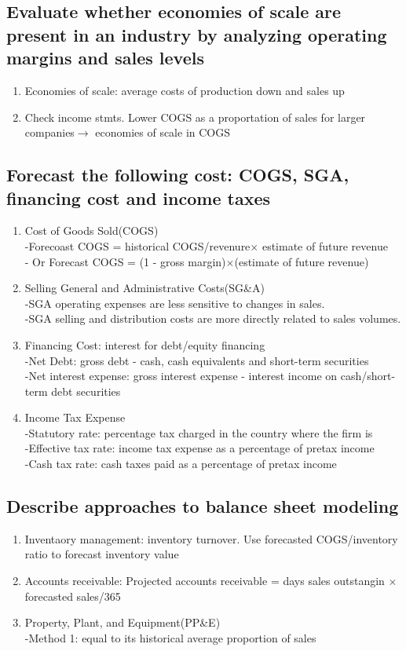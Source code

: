 \documentclass{article}
\newcommand{\be}{\begin{enumerate}}
\newcommand{\ee}{\end{enumerate}}
\newcommand{\ra}{$\rightarrow$}
\begin{document}
\subsection{Evaluate whether economies of scale are present in an industry by analyzing 
operating margins and sales levels}
\be
    \item Economies of scale: average costs of production down and sales up
    \item Check income stmts. Lower COGS as a proportation of sales for larger companies\ra
        economies of scale in COGS
\ee
\subsection{Forecast the following cost: COGS, SGA, financing cost and income taxes}
\be
    \item Cost of Goods Sold(COGS)
        \\-Forecoast COGS = historical COGS/revenure$\times$ estimate of future revenue
        \\- Or Forecast COGS = (1 - gross margin)$\times$(estimate of future revenue)
    \item Selling General and Administrative Costs(SG\&A)
        \\-SGA operating expenses are less sensitive to changes in sales.
        \\-SGA selling and distribution costs are more directly related to sales volumes.
    \item Financing Cost: interest for debt/equity financing
        \\-Net Debt: gross debt - cash, cash equivalents and short-term securities
        \\-Net interest expense: gross interest expense - interest income on cash/short-term debt
        securities
    \item Income Tax Expense
        \\-Statutory rate: percentage tax charged in the country where the firm is
        \\-Effective tax rate: income tax expense as a percentage of pretax income
        \\-Cash tax rate: cash taxes paid as a percentage of pretax income
\ee
\subsection{Describe approaches to balance sheet modeling}
\be
    \item Inventaory management: inventory turnover. Use forecasted COGS/inventory ratio
        to forecast inventory value
    \item Accounts receivable: Projected accounts receivable = days sales outstangin $\times$ forecasted
        sales/365
    \item Property, Plant, and Equipment(PP\&E)
        \\-Method 1: equal to its historical average proportion of sales
\ee
\end{document}

